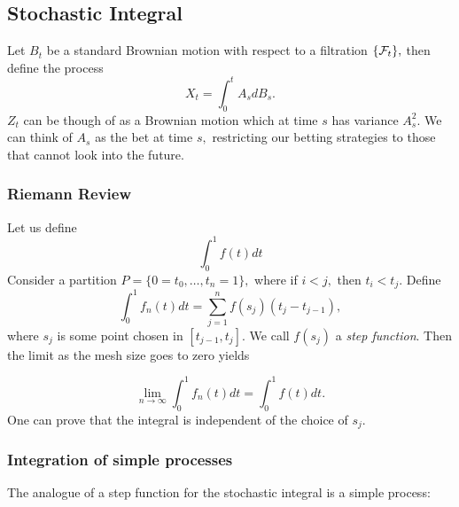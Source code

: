 \documentclass[oneside]{book}
\begin{document}
\subsection{Stochastic Integral}
Let $B_t$ be a standard Brownian motion with respect to a filtration $\{\mathcal{F}_t\},$ then define the process
\[X_t = \int_0^t A_s dB_s.\]
$Z_t$ can be though of as a Brownian motion which at time $s$ has variance $A_s^2.$ We can think of $A_s$ as the bet at time $s,$ restricting our betting strategies to those that cannot look into the future. 
\subsubsection{Riemann Review}
Let us define 
\[\int_0^1 f(t)dt\]
Consider a partition $P = \{0=t_0, \dots, t_n = 1\},$ where if $i<j,$ then $t_i < t_j.$ Define 
\[\int_0^1 f_n(t)dt = \sum_{j=1}^n f(s_j)(t_j - t_{j-1}),\] where $s_j$ is some point chosen in $[t_{j-1}, t_j].$ We call $f(s_j)$ a \textit{step function}. Then the limit as the mesh size goes to zero yields

\[\lim\limits_{n\to \infty}\int_0^1 f_n(t)dt = \int_0^1 f(t)dt.\] One can prove that the integral is independent of the choice of $s_j.$

\subsubsection{Integration of simple processes}
The analogue of a step function for the stochastic integral is a simple process:


\end{document}
